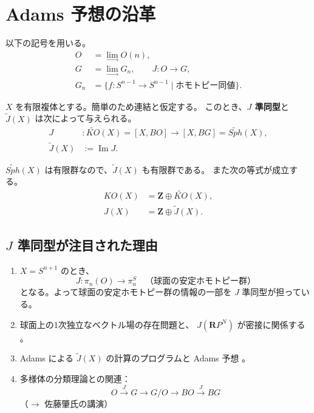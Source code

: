 \documentclass[uplatex,dvipdfmx,a4paper,12pt]{jlreq}
\newcommand{\Z}{\mathbf{Z}}
\begin{document}
\section{Adams 予想の沿革}

以下の記号を用いる。
\begin{align*}
  O   &= \lim_{\longrightarrow} O(n), \\
  G   &= \lim_{\longrightarrow} G_n, \qquad
        J : O \longrightarrow G, \\
  G_n &= \{f : S^{n-1} \longrightarrow S^{n-1} \mid
        \text{ホモトピー同値}\}.
\end{align*}

$X$ を有限複体とする。簡単のため連結と仮定する。
このとき、\textbf{$J$ 準同型}と $\tilde{J}(X)$ は次によって与えられる。
\begin{align*}
  J           &: \widetilde{KO}(X) = [X, BO]
                \longrightarrow [X, BG] = \widetilde{\mathit{Sph}}(X), \\
  \tilde{J}(X) &:= \operatorname{Im} J.
\end{align*}

$\widetilde{\mathit{Sph}}(X)$ は有限群なので、$\tilde{J}(X)$ も有限群である。
また次の等式が成立する。
\begin{align*}
  KO(X) &= \Z \oplus \widetilde{KO}(X), \\
  J(X)  &= \Z \oplus \tilde{J}(X).
\end{align*}

\subsection{$J$ 準同型が注目された理由}

\begin{enumerate}
  \item $X = S^{n+1}$ のとき、
        \[
          J : \pi_n(O) \longrightarrow \pi^S_n
          \quad \text{（球面の安定ホモトピー群）}
        \]
        となる。よって球面の安定ホモトピー群の情報の一部を
        $J$ 準同型が担っている。

  \item 球面上の1次独立なベクトル場の存在問題と、
        $J(\mathbf{R}P^N)$ が密接に関係する \cite{At61}。

  \item Adams による $\tilde{J}(X)$ の計算のプログラムと
        Adams 予想 \cite{Ad63, Ad65}。

  \item 多様体の分類理論との関連：
        \[
          O \stackrel{J}{\longrightarrow} G
          \longrightarrow G/O \longrightarrow
          BO \stackrel{J}{\longrightarrow} BG
        \]
        （$\longrightarrow$ 佐藤肇氏の講演）
\end{enumerate}
\end{document}
